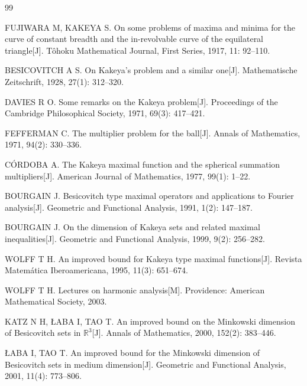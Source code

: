 \begin{thebibliography}{99}
\setlength{\itemsep}{1pt}
\raggedright

FUJIWARA M, KAKEYA S. On some problems of maxima and minima for the curve of constant breadth and the in-revolvable curve of the equilateral triangle[J]. T\^ohoku Mathematical Journal, First Series, 1917, 11: 92--110.

BESICOVITCH A S. On Kakeya's problem and a similar one[J]. Mathematische Zeitschrift, 1928, 27(1): 312--320.

DAVIES R O. Some remarks on the Kakeya problem[J]. Proceedings of the Cambridge Philosophical Society, 1971, 69(3): 417--421.

FEFFERMAN C. The multiplier problem for the ball[J]. Annals of Mathematics, 1971, 94(2): 330--336.

C\'ORDOBA A. The Kakeya maximal function and the spherical summation multipliers[J]. American Journal of Mathematics, 1977, 99(1): 1--22.

BOURGAIN J. Besicovitch type maximal operators and applications to Fourier analysis[J]. Geometric and Functional Analysis, 1991, 1(2): 147--187.

BOURGAIN J. On the dimension of Kakeya sets and related maximal inequalities[J]. Geometric and Functional Analysis, 1999, 9(2): 256--282.

WOLFF T H. An improved bound for Kakeya type maximal functions[J]. Revista Matem\'atica Iberoamericana, 1995, 11(3): 651--674.

WOLFF T H. Lectures on harmonic analysis[M]. Providence: American Mathematical Society, 2003.

KATZ N H, \L ABA I, TAO T. An improved bound on the Minkowski dimension of Besicovitch sets in $\mathbb{R}^3$[J]. Annals of Mathematics, 2000, 152(2): 383--446.

\L ABA I, TAO T. An improved bound for the Minkowski dimension of Besicovitch sets in medium dimension[J]. Geometric and Functional Analysis, 2001, 11(4): 773--806.


\end{thebibliography}
